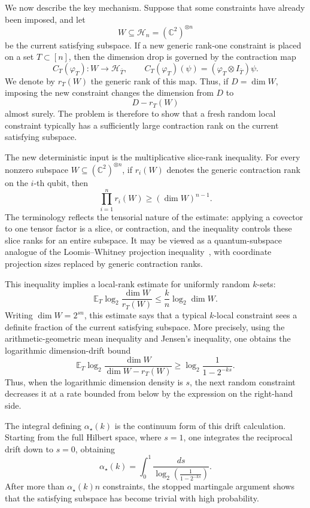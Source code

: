 \documentclass[11pt]{article}
\begin{document}
We now describe the key mechanism.  Suppose that some constraints have already
been imposed, and let
\[
W\subseteq \mathcal H_n=(\mathbb C^2)^{\otimes n}
\]
be the current satisfying subspace.  If a new generic rank-one constraint is
placed on a set \(T\subset[n]\), then the dimension drop is governed by the
contraction map
\[
C_T(\varphi_T):W\to\mathcal H_{\bar T},
\qquad
C_T(\varphi_T)(\psi)=(\varphi_T\otimes I_{\bar T})\psi .
\]
We denote by \(r_T(W)\) the generic rank of this map.  Thus, if
\(D=\dim W\), imposing the new constraint changes the dimension from \(D\) to
\[
D-r_T(W)
\]
almost surely.  The problem is therefore to show that a fresh random local
constraint typically has a sufficiently large contraction rank on the current
satisfying subspace.

The new deterministic input is the multiplicative slice-rank inequality.  For
every nonzero subspace \(W\subseteq(\mathbb C^2)^{\otimes n}\), if \(r_i(W)\)
denotes the generic contraction rank on the \(i\)-th qubit, then
\[
\prod_{i=1}^n r_i(W)\geq(\dim W)^{n-1}.
\]
The terminology reflects the tensorial nature of the estimate: applying a
covector to one tensor factor is a slice, or contraction, and the inequality
controls these slice ranks for an entire subspace.  It may be viewed as a
quantum-subspace analogue of the Loomis--Whitney projection
inequality~\cite{LoomisWhitney49}, with coordinate projection sizes replaced
by generic contraction ranks.

This inequality implies a local-rank estimate for uniformly random
\(k\)-sets:
\[
\mathbb E_T
\log_2\frac{\dim W}{r_T(W)}
\leq
\frac{k}{n}\log_2\dim W .
\]
Writing \(\dim W=2^{sn}\), this estimate says that a typical \(k\)-local
constraint sees a definite fraction of the current satisfying subspace.  More
precisely, using the arithmetic-geometric mean inequality and Jensen's
inequality, one obtains the logarithmic dimension-drift bound
\[
\mathbb E_T
\log_2\frac{\dim W}{\dim W-r_T(W)}
\geq
\log_2\frac{1}{1-2^{-ks}}.
\]
Thus, when the logarithmic dimension density is \(s\), the next random
constraint decreases it at a rate bounded from below by the expression on the
right-hand side.

The integral defining \(\alpha_\star(k)\) is the continuum form of this drift
calculation.  Starting from the full Hilbert space, where \(s=1\), one
integrates the reciprocal drift down to \(s=0\), obtaining
\[
\alpha_\star(k)
=
\int_0^1
\frac{ds}{
	\log_2\left(\frac{1}{1-2^{-ks}}\right)
} .
\]
After more than \(\alpha_\star(k)n\) constraints, the stopped martingale
argument shows that the satisfying subspace has become trivial with high
probability.
\end{document}
